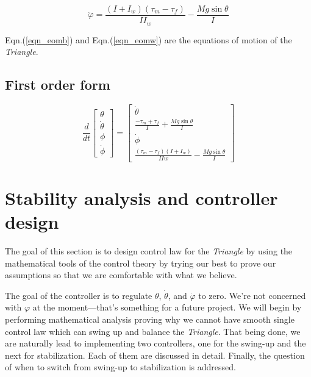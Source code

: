 \documentclass{article}
\begin{document}
\begin{equation}
  \label{eqn_eomw}
  \ddot{\varphi} = \dfrac{(I + I_w)(\tau_m - \tau_f)}{I I_w} - \dfrac{M g \sin\theta}{I}
\end{equation}

Eqn.(\ref{eqn_eomb}) and Eqn.(\ref{eqn_eomw}) are the equations of motion of the \textit{Triangle}.

\subsection{First order form}
\begin{center}
  \[
\frac{d}{dt}
\begin{bmatrix}
\theta \\
\dot{\theta} \\
\phi \\
\dot{\phi} 
\end{bmatrix}
=
\begin{bmatrix}
\dot{\theta} \\
\frac{-\tau_m + \tau_f}{I} + \frac{Mg\sin\theta}{I} \\
\dot{\phi} \\
\frac{(\tau_m - \tau_f)(I + I_w)}{IIw} - \frac{Mg \sin\theta}{I}
\end{bmatrix}
\]
\end{center}

\section{Stability analysis and controller design}

The goal of this section is to design control law for the \textit{Triangle} by using the mathematical tools of the control theory by trying our best to prove our assumptions so that we are comfortable with what we believe.

The goal of the controller is to regulate $\theta$,  $\dot{\theta}$, and $\dot{\varphi}$ to zero. We're not concerned with $\varphi$ at the moment—that's something for a future project. We will begin by performing mathematical analysis proving why we cannot have smooth single control law which can swing up and balance the \textit{Triangle}. That being done, we are naturally lead to implementing two controllers, one for the swing-up and the next for stabilization. Each of them are discussed in detail. Finally, the question of when to switch from swing-up to stabilization is addressed.
\end{document}
